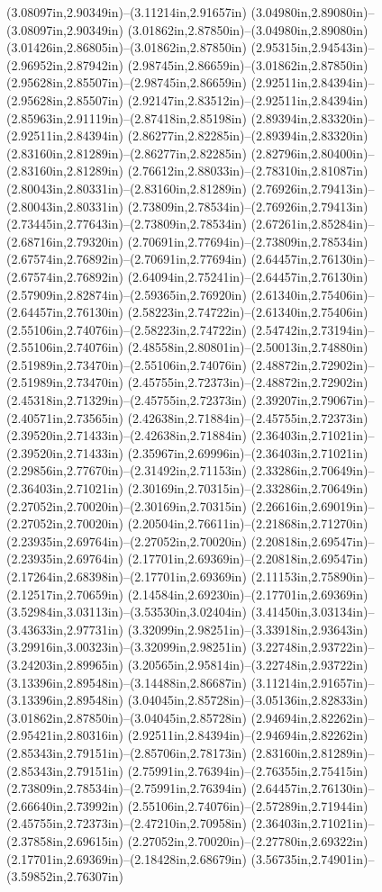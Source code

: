 (3.08097in,2.90349in)--(3.11214in,2.91657in) (3.04980in,2.89080in)--(3.08097in,2.90349in) (3.01862in,2.87850in)--(3.04980in,2.89080in) (3.01426in,2.86805in)--(3.01862in,2.87850in) (2.95315in,2.94543in)--(2.96952in,2.87942in) (2.98745in,2.86659in)--(3.01862in,2.87850in) (2.95628in,2.85507in)--(2.98745in,2.86659in) (2.92511in,2.84394in)--(2.95628in,2.85507in) (2.92147in,2.83512in)--(2.92511in,2.84394in) (2.85963in,2.91119in)--(2.87418in,2.85198in) (2.89394in,2.83320in)--(2.92511in,2.84394in) (2.86277in,2.82285in)--(2.89394in,2.83320in) (2.83160in,2.81289in)--(2.86277in,2.82285in) (2.82796in,2.80400in)--(2.83160in,2.81289in) (2.76612in,2.88033in)--(2.78310in,2.81087in) (2.80043in,2.80331in)--(2.83160in,2.81289in) (2.76926in,2.79413in)--(2.80043in,2.80331in) (2.73809in,2.78534in)--(2.76926in,2.79413in) (2.73445in,2.77643in)--(2.73809in,2.78534in) (2.67261in,2.85284in)--(2.68716in,2.79320in) (2.70691in,2.77694in)--(2.73809in,2.78534in) (2.67574in,2.76892in)--(2.70691in,2.77694in) (2.64457in,2.76130in)--(2.67574in,2.76892in) (2.64094in,2.75241in)--(2.64457in,2.76130in) (2.57909in,2.82874in)--(2.59365in,2.76920in) (2.61340in,2.75406in)--(2.64457in,2.76130in) (2.58223in,2.74722in)--(2.61340in,2.75406in) (2.55106in,2.74076in)--(2.58223in,2.74722in) (2.54742in,2.73194in)--(2.55106in,2.74076in) (2.48558in,2.80801in)--(2.50013in,2.74880in) (2.51989in,2.73470in)--(2.55106in,2.74076in) (2.48872in,2.72902in)--(2.51989in,2.73470in) (2.45755in,2.72373in)--(2.48872in,2.72902in) (2.45318in,2.71329in)--(2.45755in,2.72373in) (2.39207in,2.79067in)--(2.40571in,2.73565in) (2.42638in,2.71884in)--(2.45755in,2.72373in) (2.39520in,2.71433in)--(2.42638in,2.71884in) (2.36403in,2.71021in)--(2.39520in,2.71433in) (2.35967in,2.69996in)--(2.36403in,2.71021in) (2.29856in,2.77670in)--(2.31492in,2.71153in) (2.33286in,2.70649in)--(2.36403in,2.71021in) (2.30169in,2.70315in)--(2.33286in,2.70649in) (2.27052in,2.70020in)--(2.30169in,2.70315in) (2.26616in,2.69019in)--(2.27052in,2.70020in) (2.20504in,2.76611in)--(2.21868in,2.71270in) (2.23935in,2.69764in)--(2.27052in,2.70020in) (2.20818in,2.69547in)--(2.23935in,2.69764in) (2.17701in,2.69369in)--(2.20818in,2.69547in) (2.17264in,2.68398in)--(2.17701in,2.69369in) (2.11153in,2.75890in)--(2.12517in,2.70659in) (2.14584in,2.69230in)--(2.17701in,2.69369in) (3.52984in,3.03113in)--(3.53530in,3.02404in) (3.41450in,3.03134in)--(3.43633in,2.97731in) (3.32099in,2.98251in)--(3.33918in,2.93643in) (3.29916in,3.00323in)--(3.32099in,2.98251in) (3.22748in,2.93722in)--(3.24203in,2.89965in) (3.20565in,2.95814in)--(3.22748in,2.93722in) (3.13396in,2.89548in)--(3.14488in,2.86687in) (3.11214in,2.91657in)--(3.13396in,2.89548in) (3.04045in,2.85728in)--(3.05136in,2.82833in) (3.01862in,2.87850in)--(3.04045in,2.85728in) (2.94694in,2.82262in)--(2.95421in,2.80316in) (2.92511in,2.84394in)--(2.94694in,2.82262in) (2.85343in,2.79151in)--(2.85706in,2.78173in) (2.83160in,2.81289in)--(2.85343in,2.79151in) (2.75991in,2.76394in)--(2.76355in,2.75415in) (2.73809in,2.78534in)--(2.75991in,2.76394in) (2.64457in,2.76130in)--(2.66640in,2.73992in) (2.55106in,2.74076in)--(2.57289in,2.71944in) (2.45755in,2.72373in)--(2.47210in,2.70958in) (2.36403in,2.71021in)--(2.37858in,2.69615in) (2.27052in,2.70020in)--(2.27780in,2.69322in) (2.17701in,2.69369in)--(2.18428in,2.68679in) (3.56735in,2.74901in)--(3.59852in,2.76307in) 